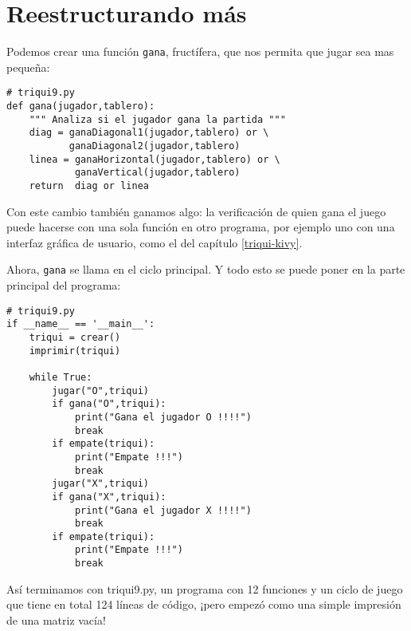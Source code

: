 \section{Reestructurando más}

Podemos crear una función \texttt{gana}, fructífera, que nos permita
que jugar sea mas pequeña:

\begin{lstlisting}
# triqui9.py
def gana(jugador,tablero):
    """ Analiza si el jugador gana la partida """
    diag = ganaDiagonal1(jugador,tablero) or \
           ganaDiagonal2(jugador,tablero)
    linea = ganaHorizontal(jugador,tablero) or \
            ganaVertical(jugador,tablero)
    return  diag or linea
\end{lstlisting}

Con este cambio también ganamos algo: la verificación de quien gana
el juego puede hacerse con una sola función en otro programa, por
ejemplo uno con una interfaz gráfica de usuario, como el del capítulo
\ref{triqui-kivy}.

Ahora, \texttt{gana} se llama en el ciclo principal. Y todo esto se
puede poner en la parte principal del programa:

\begin{lstlisting}
# triqui9.py
if __name__ == '__main__':
    triqui = crear()
    imprimir(triqui)

    while True:
        jugar("O",triqui)
        if gana("O",triqui):
            print("Gana el jugador O !!!!")
            break
        if empate(triqui):
            print("Empate !!!")
            break
        jugar("X",triqui)
        if gana("X",triqui):
            print("Gana el jugador X !!!!")
            break
        if empate(triqui):
            print("Empate !!!")
            break
\end{lstlisting}

Así terminamos con triqui9.py, un programa con 12 funciones y un ciclo
de juego que tiene en total 124 líneas de código, ¡pero empezó como
una simple impresión de una matriz vacía!

